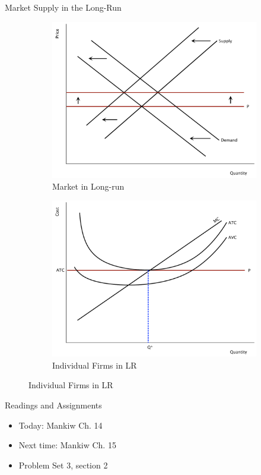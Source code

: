 \documentclass[xcolor={dvipsnames},pdf, hyperref={colorlinks=true, citecolor=ForestGreen, linkcolor=BlueViolet, urlcolor=Magenta}, handout]{beamer}
\begin{document}
\begin{frame}{Market Supply in the Long-Run}
	\begin{figure}
	\begin{subfigure}[b]{0.35\textwidth}
		\centering
		\includegraphics[scale=.2]{plot72.pdf}
		\caption{Market in Long-run}
	\end{subfigure}
	\begin{subfigure}[b]{0.35\textwidth}
		\centering
	\includegraphics[scale=.2]{plot68.pdf}
		\caption{Individual Firms in LR}
	\end{subfigure}
\end{figure}
\end{frame}


\begin{frame}{Readings and Assignments}
\begin{itemize}
	\item Today: Mankiw Ch. 14
	\item Next time: Mankiw Ch. 15
	\item Problem Set 3, section 2
\end{itemize}
\end{frame}
\end{document}
